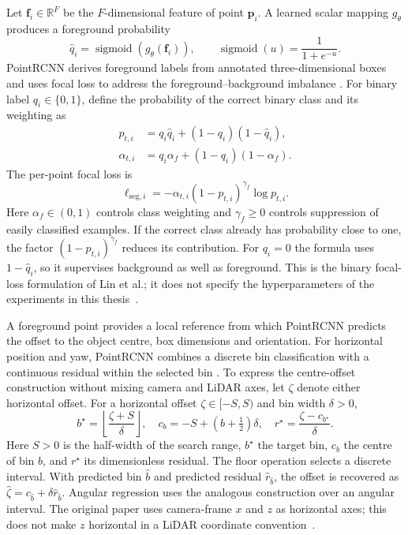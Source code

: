 Let $\mathbf f_i\in\mathbb R^F$ be the $F$-dimensional feature of point
$\mathbf p_i$. A learned scalar mapping $g_\theta$ produces a foreground
probability
\begin{equation}
 \hat q_i=\operatorname{sigmoid}(g_\theta(\mathbf f_i)),
 \qquad\operatorname{sigmoid}(u)=\frac{1}{1+e^{-u}}.
 \label{eq:fg_prob}
\end{equation}
PointRCNN derives foreground labels from annotated three-dimensional boxes
and uses focal loss to address the foreground--background imbalance
\cite{shi2019pointrcnn,lin2017focal}. For binary label $q_i\in\{0,1\}$,
define the probability of the correct binary class and its weighting as
\begin{equation}
 \begin{aligned}
 p_{t,i}&=q_i\hat q_i+(1-q_i)(1-\hat q_i),\\
 \alpha_{t,i}&=q_i\alpha_f+(1-q_i)(1-\alpha_f).
 \end{aligned}
 \label{eq:focal_targets}
\end{equation}
The per-point focal loss is
\begin{equation}
 \ell_{\mathrm{seg},i}=-\alpha_{t,i}(1-p_{t,i})^{\gamma_f}\log p_{t,i}.
 \label{eq:focal}
\end{equation}
Here $\alpha_f\in(0,1)$ controls class weighting and $\gamma_f\ge0$
controls suppression of easily classified examples. If the correct class
already has probability close to one, the factor
$(1-p_{t,i})^{\gamma_f}$ reduces its contribution. For $q_i=0$ the formula
uses $1-\hat q_i$, so it supervises background as well as foreground.
This is the binary focal-loss formulation of Lin et al.; it does not
specify the hyperparameters of the experiments in this
thesis~\cite{lin2017focal}.

A foreground point provides a local reference from which PointRCNN
predicts the offset to the object centre, box dimensions and orientation.
For horizontal position and yaw, PointRCNN combines a discrete bin
classification with a continuous residual within the selected bin
\cite{shi2019pointrcnn}. To express the centre-offset construction without
mixing camera and LiDAR axes, let $\zeta$ denote either horizontal offset.
For a horizontal offset $\zeta\in[-S,S)$ and bin width $\delta>0$,
\begin{equation}
 b^\star=\left\lfloor\frac{\zeta+S}{\delta}\right\rfloor,
 \quad c_b=-S+(b+\tfrac12)\delta,
 \quad r^\star=\frac{\zeta-c_{b^\star}}{\delta}.
 \label{eq:bin_decomposition}
\end{equation}
Here $S>0$ is the half-width of the search range, $b^\star$ the target bin,
$c_b$ the centre of bin $b$, and $r^\star$ its dimensionless residual.
The floor operation selects a discrete interval. With predicted bin
$\hat b$ and predicted residual $\hat r_{\hat b}$, the offset is recovered
as $\hat\zeta=c_{\hat b}+\delta\hat r_{\hat b}$. Angular regression uses
the analogous construction over an angular interval. The original paper
uses camera-frame $x$ and $z$ as horizontal axes; this does not make
$z$ horizontal in a LiDAR coordinate convention~\cite{shi2019pointrcnn}.

